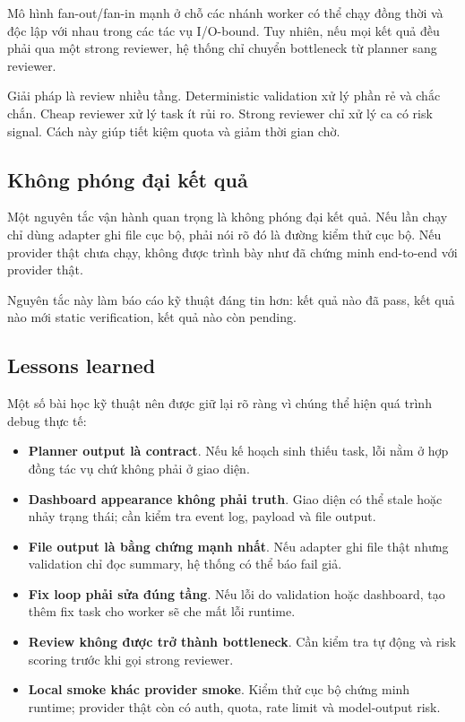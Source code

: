 \documentclass[12pt,a4paper]{article}
\begin{document}
Mô hình fan-out/fan-in mạnh ở chỗ các nhánh worker có thể chạy đồng thời và độc lập với nhau trong các tác vụ I/O-bound. Tuy nhiên, nếu mọi kết quả đều phải qua một strong reviewer, hệ thống chỉ chuyển bottleneck từ planner sang reviewer.

Giải pháp là review nhiều tầng. Deterministic validation xử lý phần rẻ và chắc chắn. Cheap reviewer xử lý task ít rủi ro. Strong reviewer chỉ xử lý ca có risk signal. Cách này giúp tiết kiệm quota và giảm thời gian chờ.

\subsection{Không phóng đại kết quả}

Một nguyên tắc vận hành quan trọng là không phóng đại kết quả. Nếu lần chạy chỉ dùng adapter ghi file cục bộ, phải nói rõ đó là đường kiểm thử cục bộ. Nếu provider thật chưa chạy, không được trình bày như đã chứng minh end-to-end với provider thật.

Nguyên tắc này làm báo cáo kỹ thuật đáng tin hơn: kết quả nào đã pass, kết quả nào mới static verification, kết quả nào còn pending.

\subsection{Lessons learned}

Một số bài học kỹ thuật nên được giữ lại rõ ràng vì chúng thể hiện quá trình debug thực tế:

\begin{itemize}
    \item \textbf{Planner output là contract}. Nếu kế hoạch sinh thiếu task, lỗi nằm ở hợp đồng tác vụ chứ không phải ở giao diện.
    \item \textbf{Dashboard appearance không phải truth}. Giao diện có thể stale hoặc nhảy trạng thái; cần kiểm tra event log, payload và file output.
    \item \textbf{File output là bằng chứng mạnh nhất}. Nếu adapter ghi file thật nhưng validation chỉ đọc summary, hệ thống có thể báo fail giả.
    \item \textbf{Fix loop phải sửa đúng tầng}. Nếu lỗi do validation hoặc dashboard, tạo thêm fix task cho worker sẽ che mất lỗi runtime.
    \item \textbf{Review không được trở thành bottleneck}. Cần kiểm tra tự động và risk scoring trước khi gọi strong reviewer.
    \item \textbf{Local smoke khác provider smoke}. Kiểm thử cục bộ chứng minh runtime; provider thật còn có auth, quota, rate limit và model-output risk.
\end{itemize}
\end{document}
